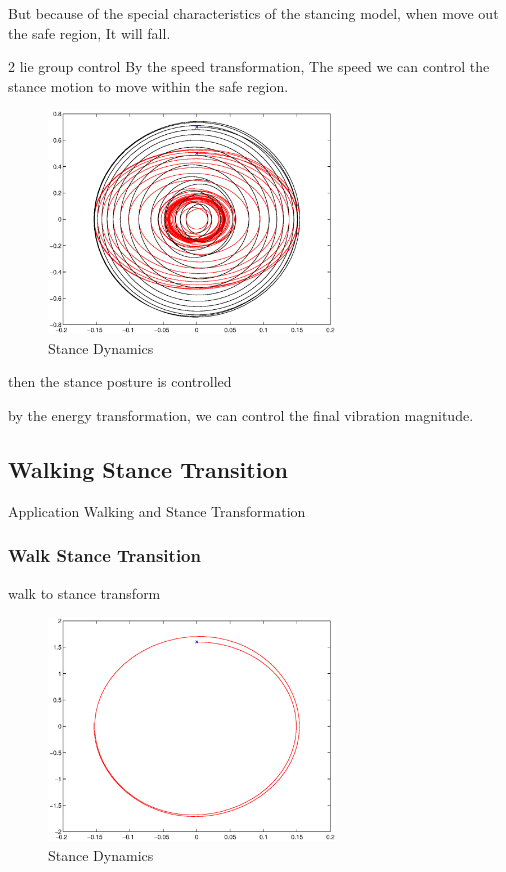But because of the special characteristics of the stancing model, when move out the safe region, 
It will fall.

2 lie group control
By the speed transformation,
The speed we can control the stance motion to move within the safe region.

\begin{figure}[ht]
  \centering
  \includegraphics[width=3in]{images/LieAttractiveCircle.eps}
  \caption{Stance Dynamics}
\end{figure}
then the stance posture is controlled

by the energy transformation,
we can control the final vibration magnitude.
\subsection{Walking Stance Transition}
Application 
Walking and Stance Transformation



\subsubsection{Walk Stance Transition}

walk to stance transform
\begin{figure}[ht]
  \centering
  \includegraphics[width=3in]{images/stanceState.eps}
  \caption{Stance Dynamics}
\end{figure}

